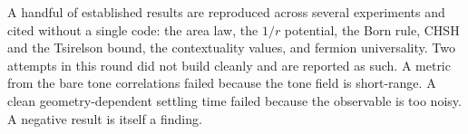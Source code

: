 A handful of established results are reproduced across several experiments and cited without a single code: the area law, the
$1/r$ potential, the Born rule, CHSH and the Tsirelson bound, the contextuality values, and fermion universality. Two
attempts in this round did not build cleanly and are reported as such. A metric from the bare tone correlations failed
because the tone field is short-range. A clean geometry-dependent settling time failed because the observable is too noisy.
A negative result is itself a finding.
